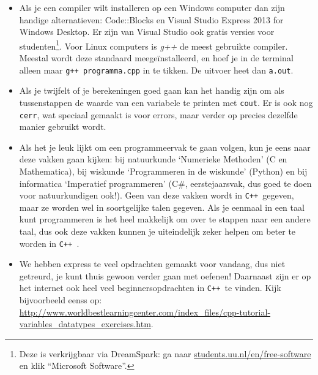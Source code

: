 \documentclass[12pt,a4paper]{article}
\newcommand{\icode}{\lstinline}
\newcommand{\mono}{\texttt}
\newcommand{\cpp}{\mono{C++ }}
\begin{document}
\begin{itemize}
	\item Als je een compiler wilt installeren op een Windows computer dan zijn handige alternatieven: Code::Blocks en Visual Studio Express 2013 for Windows Desktop. Er zijn van Visual Studio ook gratis versies voor studenten\footnote{Deze is verkrijgbaar via DreamSpark: ga naar \url{students.uu.nl/en/free-software} en klik ``Microsoft Software''.}.
		Voor Linux computers is \emph{g++} de meest gebruikte compiler. Meestal wordt deze standaard meegeïnstalleerd, en hoef je in de terminal alleen maar \mono{g++ programma.cpp} in te tikken. De uitvoer heet dan \mono{a.out}.
	\item Als je twijfelt of je berekeningen goed gaan kan het handig zijn om als tussenstappen de waarde van een variabele te printen met \icode{cout}. Er is ook nog \icode{cerr}, wat speciaal gemaakt is voor errors, maar verder op precies dezelfde manier gebruikt wordt.
	\item Als het je leuk lijkt om een programmeervak te gaan volgen, kun je eens naar deze vakken gaan kijken: bij natuurkunde `Numerieke Methoden' (C en Mathematica), bij wiskunde `Programmeren in de wiskunde' (Python) en bij informatica `Imperatief programmeren' (C\#, eerstejaarsvak, dus goed te doen voor natuurkundigen ook!). Geen van deze vakken wordt in \cpp gegeven, maar ze worden wel in soortgelijke talen gegeven. Als je eenmaal in een taal kunt programmeren is het heel makkelijk om over te stappen naar een andere taal, dus ook deze vakken kunnen je uiteindelijk zeker helpen om beter te worden in \cpp. 
	\item We hebben express te veel opdrachten gemaakt voor vandaag, dus niet getreurd, je kunt thuis gewoon verder gaan met oefenen! Daarnaast zijn er op het internet ook heel veel beginnersopdrachten in \cpp te vinden. Kijk bijvoorbeeld eenss op: \url{http://www.worldbestlearningcenter.com/index_files/cpp-tutorial-variables_datatypes_exercises.htm}.
\end{itemize}
\end{document}
